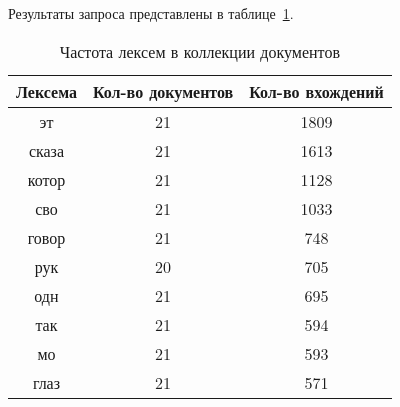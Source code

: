 \noindent Результаты запроса представлены в таблице~\ref{tab:word_frequency}.

\begin{table}[H]
    \centering
    \begin{tabular}{|c|c|c|}
        \hline
        \textbf{Лексема} & \textbf{Кол-во документов} & \textbf{Кол-во вхождений} \\ \hline
        эт & 21 & 1809 \\ \hline
        сказа & 21 & 1613 \\ \hline
        котор & 21 & 1128 \\ \hline
        сво & 21 & 1033 \\ \hline
        говор & 21 & 748 \\ \hline
        рук & 20 & 705 \\ \hline
        одн & 21 & 695 \\ \hline
        так & 21 & 594 \\ \hline
        мо & 21 & 593 \\ \hline
        глаз & 21 & 571 \\ \hline
    \end{tabular}
    \caption{Частота лексем в коллекции документов}
    \label{tab:word_frequency}
\end{table}
